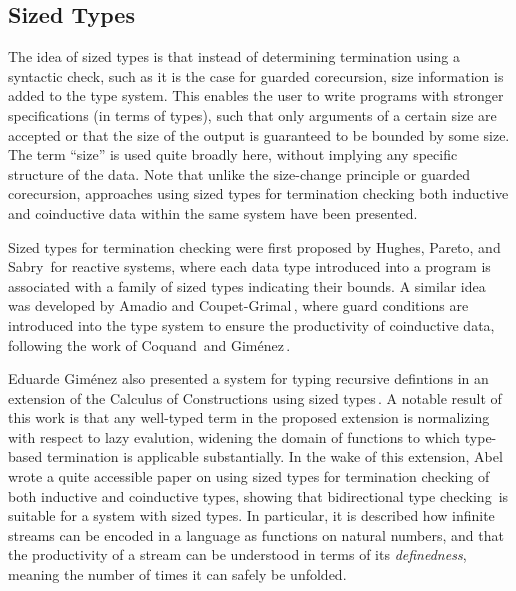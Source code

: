 \subsection{Sized Types}
The idea of sized types is that instead of determining termination using a syntactic check, such as it is the case for guarded corecursion, size information is added to the type system. This enables the user to write programs with stronger specifications (in terms of types), such that only  arguments of a certain size are accepted or that the size of the output is guaranteed to be bounded by some size. The term ``size'' is used quite broadly here, without implying any specific structure of the data. Note that unlike the size-change principle or guarded corecursion, approaches using sized types for termination checking both inductive and coinductive data within the same system have been presented.

Sized types for termination checking were first proposed by Hughes, Pareto, and Sabry\,\citep{Hughes96} for reactive systems, where each data type introduced into a program is associated with a family of sized types indicating their bounds. A similar idea was developed by Amadio and Coupet-Grimal\,\citep{Amadio98}, where guard conditions are introduced into the type system to ensure the productivity of coinductive data, following the work of Coquand\,\citep{Coquand94} and Gim\'{e}nez\,\citep{Gimenez95}.

Eduarde Gim\'{e}nez also presented a system for typing recursive defintions in an extension of the Calculus of Constructions using sized types\,\citep{Gimenez98structuralrecursive}. A notable result of this work is that any well-typed term in the proposed extension is normalizing with respect to lazy evalution, widening the domain of functions to which type-based termination is applicable substantially. In the wake of this extension, Abel\,\citep{Abel99terminationchecking} wrote a quite accessible paper on using sized types for termination checking of both inductive and coinductive types, showing that bidirectional type checking\,\citep{Pierce00} is suitable for a system with sized types. In particular, it is described how infinite streams can be encoded in a language as functions on natural numbers, and that the productivity of a stream can be understood in terms of its \emph{definedness}, meaning the number of times it can safely be unfolded.

